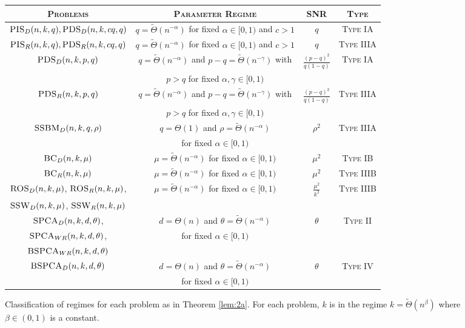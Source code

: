 \begin{figure*}
\begin{center}
\begin{tabular}{| c | c | c | c |}
\hline
\textsc{Problems} & \textsc{Parameter Regime} & \textsc{SNR} & \textsc{Type} \\
\hline
$\textsc{PIS}_D(n, k, q), \textsc{PDS}_D(n, k, cq, q)$ & $q = \tilde{\Theta}(n^{-\alpha})$ for fixed $\alpha \in [0, 1)$ and $c > 1$ & $q$ & \textsc{Type IA} \\
\hline
$\textsc{PIS}_R(n, k, q), \textsc{PDS}_R(n, k, cq, q)$ & $q = \tilde{\Theta}(n^{-\alpha})$ for fixed $\alpha \in [0, 1)$ and $c > 1$ & $q$ & \textsc{Type IIIA} \\
\hline
$\textsc{PDS}_D(n, k, p, q)$ & $q = \tilde{\Theta}(n^{-\alpha})$ and $p - q = \tilde{\Theta}(n^{-\gamma})$ with & $\frac{(p - q)^2}{q(1 - q)}$ & \textsc{Type IA} \\
& $p > q$ for fixed $\alpha, \gamma \in [0, 1)$ & & \\
\hline
$\textsc{PDS}_R(n, k, p, q)$ & $q = \tilde{\Theta}(n^{-\alpha})$ and $p - q = \tilde{\Theta}(n^{-\gamma})$ with & $\frac{(p - q)^2}{q(1 - q)}$ & \textsc{Type IIIA} \\
& $p > q$ for fixed $\alpha, \gamma \in [0, 1)$ & & \\
\hline
$\textsc{SSBM}_D(n, k, q, \rho)$ & $q = \Theta(1)$ and $\rho = \tilde{\Theta}(n^{-\alpha})$ & $\rho^2$ & \textsc{Type IIIA} \\
 & for fixed $\alpha \in [0, 1)$ & & \\
\hline
$\textsc{BC}_D(n, k, \mu)$ & $\mu = \tilde{\Theta}(n^{-\alpha})$ for fixed $\alpha \in [0, 1)$ & $\mu^2$ & \textsc{Type IB} \\
\hline
$\textsc{BC}_R(n, k, \mu)$ & $\mu = \tilde{\Theta}(n^{-\alpha})$ for fixed $\alpha \in [0, 1)$ & $\mu^2$ & \textsc{Type IIIB} \\
\hline
$\textsc{ROS}_D(n, k, \mu)$, $\textsc{ROS}_R(n, k, \mu)$, & $\mu = \tilde{\Theta}(n^{-\alpha})$ for fixed $\alpha \in [0, 1)$ & $\frac{\mu^2}{k^2}$ & \textsc{Type IIIB} \\
$\textsc{SSW}_D(n, k, \mu)$, $\textsc{SSW}_R(n, k, \mu)$ & & & \\
\hline
$\textsc{SPCA}_D(n, k, d, \theta)$, & $d = \Theta(n)$ and $\theta = \tilde{\Theta}(n^{-\alpha})$ & $\theta$ & \textsc{Type II} \\
$\textsc{SPCA}_{WR}(n, k, d, \theta)$, & for fixed $\alpha \in [0, 1)$ & & \\
$\textsc{BSPCA}_{WR}(n, k, d, \theta)$ & & & \\
\hline
$\textsc{BSPCA}_D(n, k, d, \theta)$ & $d = \Theta(n)$ and $\theta = \tilde{\Theta}(n^{-\alpha})$  & $\theta$ & \textsc{Type IV} \\
& for fixed $\alpha \in [0, 1)$ & & \\
\hline
\end{tabular}
\end{center}
\caption{Classification of regimes for each problem as in Theorem \ref{lem:2a}. For each problem, $k$ is in the regime $k = \tilde{\Theta}(n^{\beta})$ where $\beta \in (0, 1)$ is a constant.}
\label{fig:classification}
\end{figure*}

